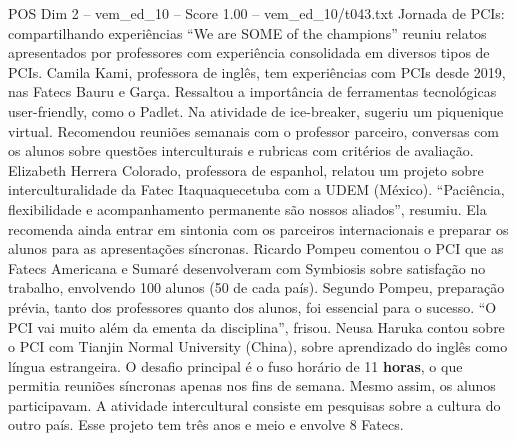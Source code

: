 \begin{textsample}{POS Dim 2 – vem\_ed\_10 – Score 1.00 – vem\_ed\_10/t043.txt}  \label{ex:f2_pos_036}
Jornada de PCIs: compartilhando experiências “We are SOME of the champions” reuniu relatos apresentados por professores com experiência consolidada em diversos tipos de PCIs.
Camila Kami, professora de inglês, tem experiências com PCIs desde 2019, nas Fatecs Bauru e Garça.
Ressaltou a importância de ferramentas tecnológicas user-friendly, como o Padlet.
Na atividade de ice-breaker, sugeriu um piquenique virtual.
Recomendou reuniões semanais com o professor parceiro, conversas com os alunos sobre questões interculturais e rubricas com critérios de avaliação.
Elizabeth Herrera Colorado, professora de espanhol, relatou um projeto sobre interculturalidade da Fatec Itaquaquecetuba com a UDEM (México). “Paciência, flexibilidade e acompanhamento permanente são nossos aliados”, resumiu.
Ela recomenda ainda entrar em sintonia com os parceiros internacionais e preparar os alunos para as apresentações síncronas.
Ricardo Pompeu comentou o PCI que as Fatecs Americana e Sumaré desenvolveram com Symbiosis sobre satisfação no trabalho, envolvendo 100 alunos (50 de cada país).
Segundo Pompeu, preparação prévia, tanto dos professores quanto dos alunos, foi essencial para o sucesso. “O PCI vai muito além da ementa da disciplina”, frisou.
Neusa Haruka contou sobre o PCI com Tianjin Normal University (China), sobre aprendizado do inglês como língua estrangeira.
O desafio principal é o fuso horário de 11 \textbf{horas}, o que permitia reuniões síncronas apenas nos fins de semana.
Mesmo assim, os alunos participavam.
A atividade intercultural consiste em pesquisas sobre a cultura do outro país.
Esse projeto tem três anos e meio e envolve 8 Fatecs.

\end{textsample}
